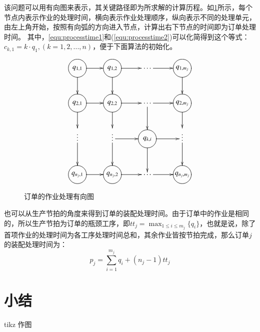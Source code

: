 该问题可以用有向图来表示，其关键路径即为所求解的计算历程。如\ref{fig:directedgraph}所示，每个节点内表示作业的处理时间，横向表示作业处理顺序，纵向表示不同的处理单元，由左上角开始，按照有向弧的方向进入节点，计算出右下节点的时间即为订单处理时间。
其中，\eqref{equ:processtime1}和(\ref{equ:processtime2})可以化简得到这个等式：$c_{k,1} = k\cdot q_1,(k = 1,2,...,n)$，便于下面算法的初始化。
\begin{figure}[h]
\begin{equation*}
\xymatrix{
\process{q_{1,1}} \ar[r] \ar[d] & \process{q_{1,2}} \ar[d] \ar[r] & \cdots\ar[r] & \process{q_{1,m_j}} \ar[d]\\
\process{q_{2,1}} \ar[r]\ar[d] & \process{q_{2,2}} \ar[d]\ar[r] & \cdots \ar[r] \ar[d]& \process{q_{2,m_j}} \ar[d] \\
\vdots\ar[d] & \vdots \ar[d]\ar[r] & \process{q_{k,i}}\ar[r]\ar[d] &\vdots \ar[d]\\
\process{q_{n_j,1}} \ar[r] & \process{q_{n_j,2}} \ar[r] & \cdots\ar[r] & \process{q_{n_j,m_j}}
}
\end{equation*}
\caption{订单的作业处理有向图\label{fig:directedgraph}}
\end{figure}

也可以从生产节拍的角度来得到订单的装配处理时间。由于订单中的作业是相同的，所以生产节拍为订单的瓶颈工序，即$\displaystyle tt_j = \max_{1\le i\le m_j}\{q_i\}$，也就是说，除了首项作业的处理时间为各工序处理时间总和，其余作业皆按节拍完成，那么订单$j$的装配处理时间为：
\[
p_j = \sum_{i = 1}^{m_j}q_i + (n_j - 1)tt_j
\]



\section{小结}

tikz 作图
\begin{figure}[h]
\centering
{}
\end{figure}